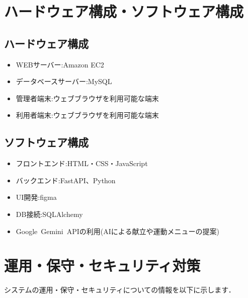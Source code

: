 \documentclass[uplatex,dvipdfmx]{jlreq}
\begin{document}

\section{ハードウェア構成・ソフトウェア構成}

\subsection{ハードウェア構成}

\begin{itemize}

  \item WEBサーバー:Amazon EC2

  \item データベースサーバー:MySQL

  \item 管理者端末:ウェブブラウザを利用可能な端末

  \item 利用者端末:ウェブブラウザを利用可能な端末

\end{itemize}



\subsection{ソフトウェア構成}

\begin{itemize}

  \item フロントエンド:HTML・CSS・JavaScript

  \item バックエンド:FastAPI、Python

  \item UI開発:figma

  \item DB接続:SQLAlchemy

  \item Google\ Gemini\ APIの利用(AIによる献立や運動メニューの提案)

\end{itemize}


\section{運用・保守・セキュリティ対策}

システムの運用・保守・セキュリティについての情報を以下に示します．
\end{document}
